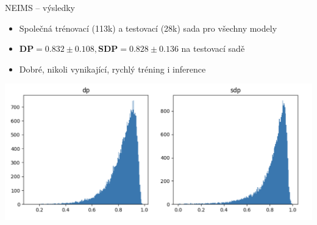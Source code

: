 \documentclass[aspectratio=169]{beamer}
\begin{document}
\begin{frame}
{NEIMS -- výsledky}
\begin{itemize}
\item Společná trénovací (113k) a testovací (28k) sada pro všechny modely 
\item $\textbf{DP} = 0.832\pm0.108, \textbf{SDP}=0.828\pm 0.136$ na testovací sadě
\item Dobré, nikoli vynikající, rychlý tréning i inference
\end{itemize}
\includegraphics[width=.8\hsize]{neims-hist}

\end{frame}

\end{document}
